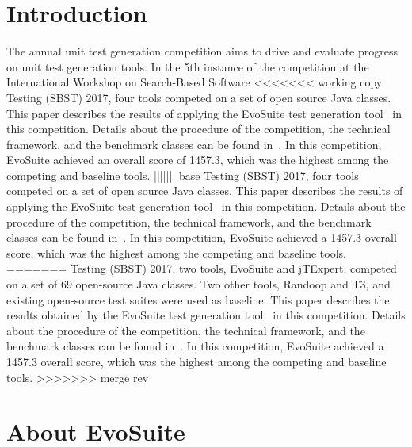 \documentclass[10pt,conference]{IEEEtran}
\newcommand{\EVOSUITE}{{\sc EvoSuite}\xspace}
\newcommand{\JTEXPERT}{{\sc jTExpert}\xspace}
\newcommand{\RANDOOP}{{\sc Randoop}\xspace}
\newcommand{\TT}{{\sc T3}\xspace}
\begin{document}
\section{Introduction}
The annual unit test generation competition aims to drive and evaluate
progress on unit test generation tools. In the 5th instance of the
competition at the International Workshop on Search-Based Software
<<<<<<< working copy
Testing (SBST) 2017, four tools competed on a set of open source Java
classes. This paper describes the results of applying the \EVOSUITE
test generation tool~\cite{FrA11c} in this competition. Details about
the procedure of the competition, the technical framework, and the
benchmark classes can be found in~\cite{sbst17competition}.  In this
competition, \EVOSUITE achieved an overall score of 1457.3, which was
the highest among the competing and baseline tools.
||||||| base
Testing (SBST) 2017, four tools competed on a set of open source Java
classes. This paper describes the results of applying the \EVOSUITE
test generation tool~\cite{FrA11c} in this competition. Details about
the procedure of the competition, the technical framework, and the
benchmark classes can be found in~\cite{sbst17competition}.  In this
competition, \EVOSUITE achieved a 1457.3 overall score, which was the
highest among the competing and baseline tools.
=======
Testing (SBST) 2017, two tools, \EVOSUITE and \JTEXPERT, competed on a
set of 69 open-source Java classes. Two other tools, \RANDOOP and \TT,
and existing open-source test suites were used as baseline. This paper
describes the results obtained by the \EVOSUITE test generation
tool~\cite{FrA11c} in this competition. Details about the procedure of
the competition, the technical framework, and the benchmark classes
can be found in~\cite{sbst17competition}.  In this competition,
\EVOSUITE achieved a 1457.3 overall score, which was the highest among
the competing and baseline tools.
>>>>>>> merge rev

\section{About EvoSuite}
\end{document}
